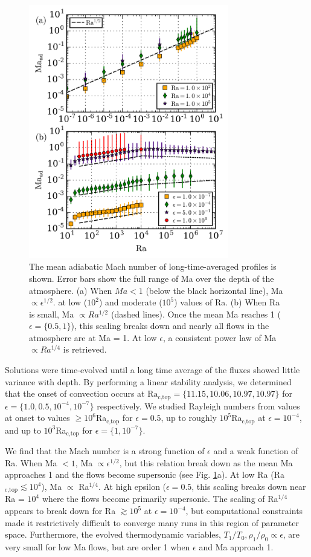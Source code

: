 \documentclass[aps, prl, twocolumn, nofootinbib, groupedaddress, amsfonts, amssymb, amsmath]{revtex4-1}
\begin{document}
\begin{figure}[t]
\includegraphics[width=3.4375in]{./figs/ma_v_Ra.png}
\caption{The mean adiabatic Mach number of long-time-averaged profiles
is shown.  Error bars show the full range of Ma over the depth of the
atmosphere.
(a) When $Ma < 1$ (below the black horizontal line), Ma $\propto \epsilon^{1/2}$.
at low ($10^2$) and moderate ($10^5$) values of Ra.
(b) When Ra is small, Ma $\propto Ra^{1/2}$ (dashed lines).
Once the mean Ma reaches 1 ($\epsilon = \{0.5, 1\}$), this scaling breaks down
and nearly all flows in the atmosphere are at Ma = 1.
At low $\epsilon$, a consistent power law of Ma $\propto Ra^{1/4}$ is retrieved.
\label{fig:ma_v_eps} }
\end{figure}


Solutions were time-evolved until a long time average of the fluxes
showed little
variance with depth. By performing a linear stability analysis, 
we determined that the onset of convection
occurs at $\text{Ra}_{\text{c,top}} = \{11.15, 10.06, 10.97, 10.97\}$ for $\epsilon = \{1.0, 0.5, 10^{-4}, 10^{-7}\}$ respectively.  
We studied Rayleigh
numbers from values at onset to values $\geq 10^6$Ra$_{\text{c,top}}$ for $\epsilon = 0.5$, up to
roughly $10^5$Ra$_{\text{c,top}}$ at $\epsilon = 10^{-4}$, and 
up to $10^3$Ra$_{\text{c,top}}$ for $\epsilon = \{1, 10^{-7}\}$.

We find that the Mach number is a strong function of $\epsilon$ and a weak function of 
Ra.  When Ma $< 1$, Ma $\propto \epsilon^{1/2}$, but this relation break down as the mean
Ma approaches 1 and the flows become supersonic (see Fig. \ref{fig:ma_v_eps}a).  At low
Ra (Ra$_{\text{c,top}} \lesssim 10^4$), Ma $\propto$ Ra$^{1/4}$.  At high epsilon
($\epsilon = 0.5$, this scaling breaks down near Ra = $10^4$ where the flows become primarily
supersonic.  The scaling of Ra$^{1/4}$ appears to break down for Ra $\gtrsim 10^5$ at
$\epsilon = 10^{-4}$, but computational constraints made it restrictively difficult to converge
many runs in this region of parameter space.
Furthermore, the evolved thermodynamic variables, $T_1/T_0, \rho_1/\rho_0 \propto \epsilon$,
are very small for low Ma flows, but are order 1 when $\epsilon$ and Ma approach 1.
\end{document}
